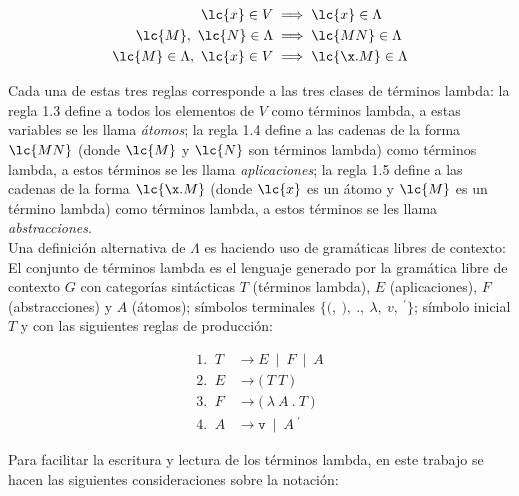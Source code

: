 \begin{align}
  \lc{x} \in V &\implies \lc{x} \in \Lambda\\
  \lc{M},\ \lc{N} \in \Lambda &\implies \lc{M N} \in \Lambda\\
  \lc{M} \in \Lambda,\ \lc{x} \in V &\implies \lc{\x.M} \in \Lambda
\end{align}

Cada una de estas tres reglas corresponde a las tres clases de términos lambda:
la regla 1.3 define a todos los elementos de \(V\) como términos lambda, a estas
variables se les llama \emph{átomos}; la regla 1.4 define a las cadenas de
la forma \(\lc{M N}\) (donde \(\lc{M}\) y \(\lc{N}\) son términos lambda) como
términos lambda, a estos términos se les llama \emph{aplicaciones}; la regla 1.5
define a las cadenas de la forma \(\lc{\x.M}\) (donde \(\lc{x}\) es un átomo y
\(\lc{M}\) es un término lambda) como términos lambda, a estos términos se les
llama \emph{abstracciones}. \\

Una definición alternativa de \(\Lambda\) es haciendo uso de gramáticas libres
de contexto: El conjunto de términos lambda es el lenguaje generado por la
gramática libre de contexto \(G\) con categorías sintácticas \(T\) (términos
lambda), \(E\) (aplicaciones), \(F\) (abstracciones) y \(A\) (átomos); símbolos
terminales \(\{\texttt{(},\ \texttt{)},\ \texttt{.},\ \lambda,\ v,\
{}^{\prime}\}\); símbolo inicial \(T\) y con las siguientes reglas de
producción:

\begin{align*}
  \text{1. }\ T &\rightarrow E\ \mid\ F\ \mid\ A\\ 
  \text{2. }\ E &\rightarrow \texttt{(}\ T\ T\ \texttt{)} \\
  \text{3. }\ F &\rightarrow \texttt{(}\ \lambda\ A\ \texttt{.}\ T\ \texttt{)} \\
  \text{4. }\ A &\rightarrow \texttt{v}\ \mid\ A\ {}^{\prime}
\end{align*}

Para facilitar la escritura y lectura de los términos lambda, en este trabajo se
hacen las siguientes consideraciones sobre la notación: \\

